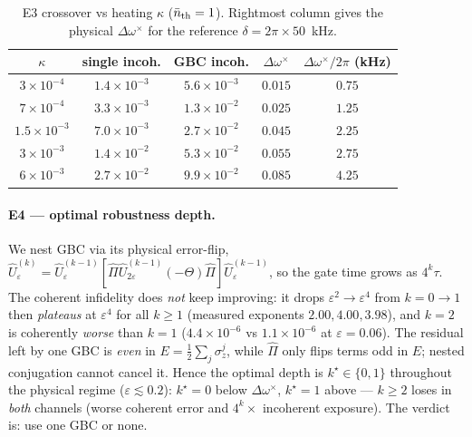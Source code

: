 \documentclass[aps,prapplied,twocolumn,superscriptaddress,floatfix,nofootinbib]{revtex4-2}
\begin{document}
\begin{table}[t]\caption{E3 crossover vs heating $\kappa$ ($\bar n_{\rm th}=1$). Rightmost
column gives the physical $\Delta\omega^\times$ for the reference $\delta=2\pi\times50$~kHz.}
\label{tab:e3}
\begin{ruledtabular}\begin{tabular}{ccccc}
$\kappa$ & single incoh. & GBC incoh. & $\Delta\omega^\times$ & $\Delta\omega^\times/2\pi$ (kHz)\\ \hline
$3\times10^{-4}$ & $1.4\times10^{-3}$ & $5.6\times10^{-3}$ & $0.015$ & $0.75$\\
$7\times10^{-4}$ & $3.3\times10^{-3}$ & $1.3\times10^{-2}$ & $0.025$ & $1.25$\\
$1.5\times10^{-3}$ & $7.0\times10^{-3}$ & $2.7\times10^{-2}$ & $0.045$ & $2.25$\\
$3\times10^{-3}$ & $1.4\times10^{-2}$ & $5.3\times10^{-2}$ & $0.055$ & $2.75$\\
$6\times10^{-3}$ & $2.7\times10^{-2}$ & $9.9\times10^{-2}$ & $0.085$ & $4.25$\\
\end{tabular}\end{ruledtabular}\end{table}

\paragraph{E4 --- optimal robustness depth.} We nest GBC via its physical
error-flip, $\hat U^{(k)}_\varepsilon=\hat U^{(k-1)}_\varepsilon[\hat\Pi\hat
U^{(k-1)}_{2\varepsilon}(-\Theta)\hat\Pi]\hat U^{(k-1)}_\varepsilon$, so the gate time grows
as $4^k\tau$. The coherent infidelity does \emph{not} keep improving: it drops
$\varepsilon^2\!\to\!\varepsilon^4$ from $k{=}0\!\to\!1$ then \emph{plateaus} at $\varepsilon^4$
for all $k\ge1$ (measured exponents $2.00,4.00,3.98$), and $k{=}2$ is coherently \emph{worse}
than $k{=}1$ ($4.4\times10^{-6}$ vs $1.1\times10^{-6}$ at $\varepsilon=0.06$). The residual
left by one GBC is \emph{even} in $E=\tfrac12\sum_j\sigma_z^j$, while $\hat\Pi$ only flips
terms odd in $E$; nested conjugation cannot cancel it. Hence the optimal depth is
$k^\star\!\in\!\{0,1\}$ throughout the physical regime ($\varepsilon\lesssim0.2$): $k^\star=0$
below $\Delta\omega^\times$, $k^\star=1$ above --- $k\ge2$ loses in \emph{both} channels
(worse coherent error and $4^k\times$ incoherent exposure). The verdict is: use one GBC or none.
\end{document}
